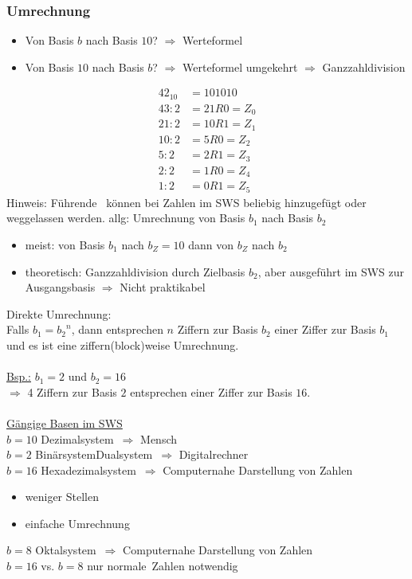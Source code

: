 \documentclass[10pt,a4paper]{scrartcl}
\begin{document}
	\subsubsection*{Umrechnung}
	\begin{itemize}
		\item Von Basis $b$ nach Basis $10$?
		\subitem $\Rightarrow$ Werteformel
		\item Von Basis $10$ nach Basis $ b $?
		\subitem $ \Rightarrow $ Werteformel umgekehrt
		\subitem $ \Rightarrow $ Ganzzahldivision
	\end{itemize}
	\begin{equation*}
	\begin{split}
	{42}_{10} &= 101010\\	
	43:2 &= 21R0 = Z_0\\
	21:2 &= 10R1 = Z_1\\
	10:2 &= 5R0 = Z_2\\
	5:2  &= 2R1 = Z_3\\
	2:2  &= 1R0 =Z_4\\
	1:2	&= 0R1 = Z_5
	\end{split}
	\end{equation*}
	Hinweis: Führende \grqq\ können bei Zahlen im \ac{SWS} beliebig hinzugefügt oder weggelassen werden. 
	allg: Umrechnung von Basis $b_1$ nach Basis $b_2$
	\begin{itemize}
		\item meist: von Basis $b_1$ nach $b_Z=10$ dann von $b_Z$ nach $b_2$
		\item theoretisch: Ganzzahldivision durch Zielbasis $b_2$, aber ausgeführt im \ac{SWS} zur Ausgangsbasis $\Rightarrow$ Nicht praktikabel
	\end{itemize}
	Direkte Umrechnung:\\
	Falls $ b_1 = {b_2}^n $, dann entsprechen $n$ Ziffern zur Basis $ b_2 $ einer Ziffer zur Basis $ b_1 $ und es ist eine ziffern(block)weise Umrechnung.\\
	\\
	\underline{Bsp.:} $ b_1=2 $ und $ b_2=16 $\\
	$ \Rightarrow $ 4 Ziffern zur Basis $ 2 $ entsprechen einer Ziffer zur Basis $ 16 $.\\ \\
	
	\noindent
	\underline{Gängige Basen im \ac{SWS}}\\
	$ b=10 $ \glqq Dezimalsystem\grqq\ $ \Rightarrow $ Mensch\\
	$ b=2 $ \glqq Binärsystem\grqq\/\glqq Dualsystem\grqq\ $ \Rightarrow $ Digitalrechner \\
	$ b=16 $ \glqq Hexadezimalsystem\grqq\ $ \Rightarrow $ Computernahe Darstellung von Zahlen
	\begin{itemize}
		\itemsep0em
		\vspace{-0.2cm}
		\item weniger Stellen
		\item einfache Umrechnung
	\end{itemize}
	$ b=8 $ \glqq Oktalsystem\grqq\ $ \Rightarrow $ Computernahe Darstellung von Zahlen\\
	$ b=16 $ vs. $ b=8 $ nur \glqq normale\grqq\ Zahlen notwendig
	
\end{document}
